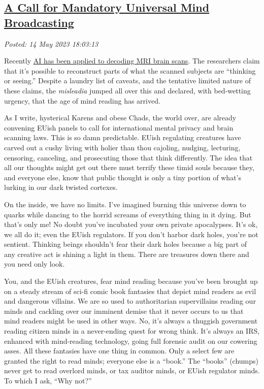 %

\subsection*{\href{http://analyzethedatanotthedrivel.org/2023/05/14/a-call-for-mandatory-universal-mind-broadcasting/}{A Call for Mandatory Universal Mind Broadcasting}}


\noindent\emph{Posted: 14 May 2023 18:03:13}
\vspace{6pt}

Recently
\href{https://www.npr.org/sections/health-shots/2023/05/01/1173045261/a-decoder-that-uses-brain-scans-to-know-what-you-mean-mostly}{AI
has been applied to decoding MRI brain scans}. The researchers claim
that it's possible to reconstruct parts of what the scanned subjects are
``thinking or seeing.'' Despite a laundry list of caveats, and the
tentative limited nature of these claims, the \emph{misleadia} jumped
all over this and declared, with bed-wetting urgency, that the age of
mind reading has arrived.

As I write, hysterical Karens and obese Chads, the world over, are
already convening EUish panels to call for international mental privacy
and brain scanning laws. This is so damn predictable. EUish regulating
creatures have carved out a cushy living with holier than thou cajoling,
nudging, lecturing, censoring, canceling, and prosecuting those that
think differently. The idea that all our thoughts might get out there
must terrify these timid souls because they, and everyone else, know
that public thought is only a tiny portion of what's lurking in our dark
twisted cortexes.

On the inside, we have no limits. I've imagined burning this universe
down to quarks while dancing to the horrid screams of everything thing
in it dying. But that's only me! No doubt you've incubated your own
private apocalypses. It's ok, we all do it; even the EUish regulators.
If you don't harbor dark holes, you're not sentient. Thinking beings
shouldn't fear their dark holes because a big part of any creative act
is shining a light in them. There are treasures down there and you need
only look.

You, and the EUish creatures, fear mind reading because you've been
brought up on a steady stream of sci-fi comic book fantasies that depict
mind readers as evil and dangerous villains. We are so used to
authoritarian supervillains reading our minds and cackling over our
imminent demise that it never occurs to us that mind readers might be
used in other ways. No, it's always a thuggish government reading
citizen minds in a never-ending quest for wrong think. It's always an
IRS, enhanced with mind-reading technology, going full forensic audit on
our cowering asses. All these fantasies have one thing in common. Only a
select few are granted the right to read minds; everyone else is a
``book.'' The ``books'' (chumps) never get to read overlord minds, or
tax auditor minds, or EUish regulator minds. To which I ask, ``Why
not?''

